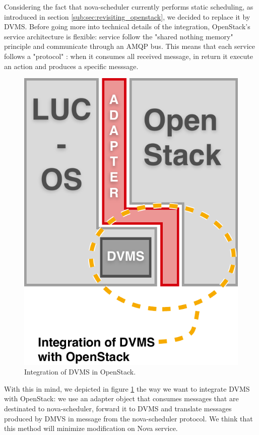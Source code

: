 





Considering the fact that nova-scheduler currently performs static scheduling, 
as introduced in section \ref{sub:sec:revisiting_openstack}, we decided to 
replace it by DVMS. Before going more into technical details of the integration,
OpenStack's service architecture is flexible: service follow the "shared nothing
memory" principle and communicate through an AMQP bus. This means that each 
service follows a "protocol" : when it consumes all received message, in return
it execute an action and produces a specific messsage. 

\begin{figure}[h]
	\centering
	\includegraphics[width=0.50\linewidth]{Figures/dvms_openstack.pdf}
	\caption{Integration of DVMS in OpenStack.}%
	\label{fig:integration}%
\end{figure}

With this in mind, we depicted in figure \ref{fig:integration} the way we want 
to integrate DVMS with OpenStack: we use an adapter object that consumes 
messages that are destinated to nova-scheduler, forward it to DVMS and translate
messages produced by DMVS in message from the nova-scheduler protocol. We think
that this method will minimize modification on Nova service.
